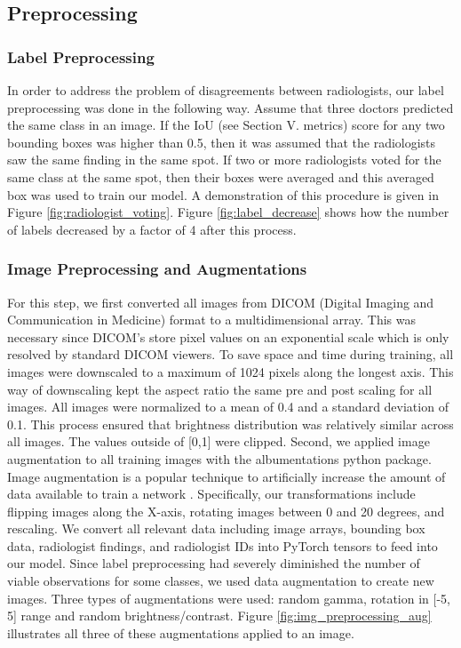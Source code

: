 \documentclass[conference]{IEEEtran}
\begin{document}
\subsection{Preprocessing}

\subsubsection{Label Preprocessing}
In order to address the problem of disagreements between radiologists, our label preprocessing was done in the following way. Assume that three doctors predicted the same class in an image. If the IoU (see Section V. metrics) score for any two bounding boxes was higher than 0.5, then it was assumed that the radiologists saw the same finding in the same spot. If two or more radiologists voted for the same class at the same spot, then their boxes were averaged and this averaged box was used to train our model. A demonstration of this procedure is given in Figure \ref{fig:radiologist_voting}. Figure \ref{fig:label_decrease} shows how the number of labels decreased by a factor of 4 after this process.

\subsubsection{Image Preprocessing and Augmentations}
For this step, we first converted all images from DICOM (Digital Imaging and Communication in Medicine) format to a multidimensional array. This was necessary since DICOM’s store pixel values on an exponential scale which is only resolved by standard DICOM viewers. To save space and time during training, all images were downscaled to a maximum of 1024 pixels along the longest axis. This way of downscaling kept the aspect ratio the same pre and post scaling for all images. All images were normalized to a mean of 0.4 and a standard deviation of 0.1. This process ensured that brightness distribution was relatively similar across all images. The values outside of [0,1] were clipped. Second, we applied image augmentation to all training images with the albumentations python package. Image augmentation is a popular technique to artificially increase the amount of data available to train a network \cite{perez2017effectiveness}. Specifically, our transformations include flipping images along the X-axis, rotating images between 0 and 20 degrees, and rescaling. We convert all relevant data including image arrays, bounding box data, radiologist findings, and radiologist IDs into PyTorch tensors to feed into our model. Since label preprocessing had severely diminished the number of viable observations for some classes, we used data augmentation to create new images. Three types of augmentations were used: random gamma, rotation in [-5, 5] range and random brightness/contrast. Figure \ref{fig:img_preprocessing_aug} illustrates all three of these augmentations applied to an image. 
\end{document}
